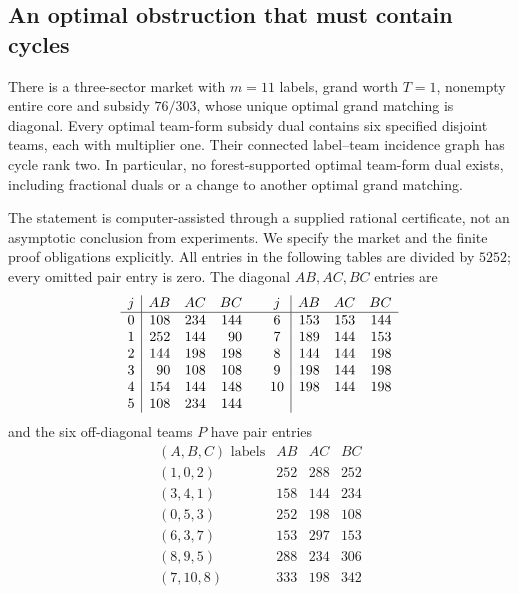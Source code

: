 \subsection{An optimal obstruction that must contain cycles}
\begin{proposition}\label{anc:cycles}
There is a three-sector market with $m=11$ labels, grand worth $T=1$,
nonempty entire core and subsidy $76/303$, whose unique optimal grand
matching is diagonal. Every optimal team-form subsidy dual contains six
specified disjoint teams, each with multiplier one. Their connected
label--team incidence graph has cycle rank two. In particular, no
forest-supported optimal team-form dual exists, including fractional
duals or a change to another optimal grand matching.
\end{proposition}
The statement is computer-assisted through a supplied rational
certificate, not an asymptotic conclusion from experiments. We specify
the market and the finite proof obligations explicitly. All entries in
the following tables are divided by $5252$; every omitted pair entry
is zero. The diagonal $AB,AC,BC$ entries are
\[
\begin{array}{c|rrr@{\qquad}c|rrr}
 j&AB&AC&BC&j&AB&AC&BC\\\hline
 0&108&234&144&6&153&153&144\\
 1&252&144&90 &7&189&144&153\\
 2&144&198&198&8&144&144&198\\
 3&90&108&108 &9&198&144&198\\
 4&154&144&148&10&198&144&198\\
 5&108&234&144&&&&
\end{array}
\]
and the six off-diagonal teams $P$ have pair entries
\[
\begin{array}{c|rrr}
 (A,B,C)\text{ labels}&AB&AC&BC\\\hline
 (1,0,2)&252&288&252\\
 (3,4,1)&158&144&234\\
 (0,5,3)&252&198&108\\
 (6,3,7)&153&297&153\\
 (8,9,5)&288&234&306\\
 (7,10,8)&333&198&342
\end{array}
\]

